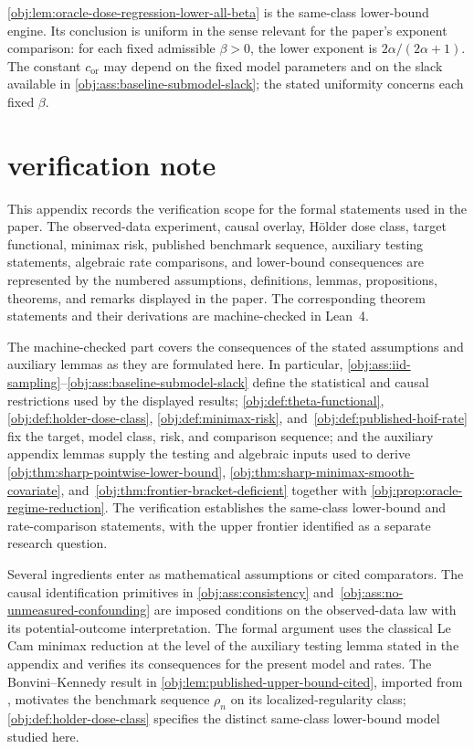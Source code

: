 \documentclass[11pt]{article}
\begin{document}
\cref{obj:lem:oracle-dose-regression-lower-all-beta} is the same-class lower-bound engine. Its conclusion is uniform in the sense relevant for the paper's exponent comparison: for each fixed admissible \(\beta>0\), the lower exponent is \(2\alpha/(2\alpha+1)\). The constant \(c_{\mathrm{or}}\) may depend on the fixed model parameters and on the slack available in \cref{obj:ass:baseline-submodel-slack}; the stated uniformity concerns each fixed \(\beta\).


\section{verification note}

This appendix records the verification scope for the formal statements used in the paper. The observed-data experiment, causal overlay, Hölder dose class, target functional, minimax risk, published benchmark sequence, auxiliary testing statements, algebraic rate comparisons, and lower-bound consequences are represented by the numbered assumptions, definitions, lemmas, propositions, theorems, and remarks displayed in the paper. The corresponding theorem statements and their derivations are machine-checked in Lean~4.

The machine-checked part covers the consequences of the stated assumptions and auxiliary lemmas as they are formulated here. In particular, \cref{obj:ass:iid-sampling}--\cref{obj:ass:baseline-submodel-slack} define the statistical and causal restrictions used by the displayed results; \cref{obj:def:theta-functional}, \cref{obj:def:holder-dose-class}, \cref{obj:def:minimax-risk}, and~\cref{obj:def:published-hoif-rate} fix the target, model class, risk, and comparison sequence; and the auxiliary appendix lemmas supply the testing and algebraic inputs used to derive \cref{obj:thm:sharp-pointwise-lower-bound}, \cref{obj:thm:sharp-minimax-smooth-covariate}, and~\cref{obj:thm:frontier-bracket-deficient} together with \cref{obj:prop:oracle-regime-reduction}. The verification establishes the same-class lower-bound and rate-comparison statements, with the upper frontier identified as a separate research question.

Several ingredients enter as mathematical assumptions or cited comparators. The causal identification primitives in \cref{obj:ass:consistency} and~\cref{obj:ass:no-unmeasured-confounding} are imposed conditions on the observed-data law with its potential-outcome interpretation. The formal argument uses the classical Le Cam minimax reduction at the level of the auxiliary testing lemma stated in the appendix and verifies its consequences for the present model and rates. The Bonvini--Kennedy result in \cref{obj:lem:published-upper-bound-cited}, imported from \citet{bonvini2022}, motivates the benchmark sequence \(\rho_n\) on its localized-regularity class; \cref{obj:def:holder-dose-class} specifies the distinct same-class lower-bound model studied here.
\end{document}
